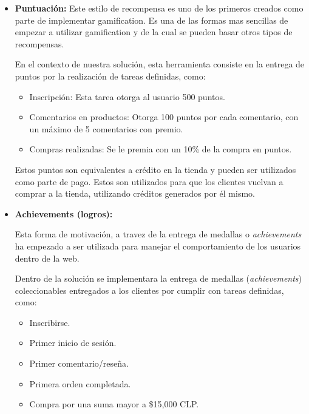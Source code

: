 \begin{itemize}
    \item {\bf Puntuación:}
	Este estilo de recompensa es uno de los primeros creados como parte de
	implementar gamification. Es una de las formas mas sencillas de empezar
 	a utilizar gamification\cite{OnlineComp} y de la cual se pueden basar otros tipos de recompensas.

        En el contexto de nuestra solución, esta herramienta consiste en la entrega de
	puntos por la realización de tareas definidas, como:

    \begin{itemize}
        \item Inscripción:
            Esta tarea otorga al usuario 500 puntos.
        \item Comentarios en productos:
            Otorga 100 puntos por cada comentario, con un máximo de 5 comentarios
            con premio.
        \item Compras realizadas:
            Se le premia con un 10\% de la compra en puntos.
    \end{itemize}

        Estos puntos son equivalentes a crédito en la tienda y pueden ser
        utilizados como parte de pago.
        Estos son utilizados para que los clientes vuelvan a comprar a la tienda,
        utilizando créditos generados por él mismo.


    \item {\bf Achievements (logros):}

	Esta forma de motivación, a travez de la entrega de medallas o \emph{achievements}
	ha empezado a ser utilizada para manejar el comportamiento de los
	usuarios dentro de la web\cite{BehaviorBadges}.

        Dentro de la solución se implementara la entrega de medallas (\emph{achievements})
	coleccionables entregados a los clientes por cumplir con tareas definidas, como:

        \begin{itemize}
            \item Inscribirse.
            \item Primer inicio de sesión.
            \item Primer comentario/reseña.
            \item Primera orden completada.
            \item Compra por una suma mayor a \$15,000 CLP.
        \end{itemize}


\end{itemize}
